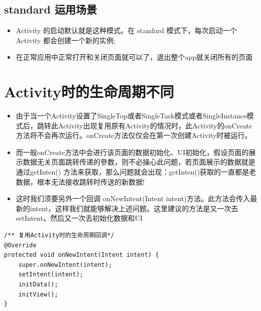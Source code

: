 \documentclass[9pt, b5paaper]{book}
\begin{document}
\subsection{standard 运用场景}
\label{sec-4-10-4}
\begin{itemize}
\item Activity 的启动默认就是这种模式。在 standard 模式下，每次启动一个 Activity 都会创建一个新的实例;
\item 在正常应用中正常打开和关闭页面就可以了，退出整个app就关闭所有的页面
\end{itemize}
\section{Activity时的生命周期不同}
\label{sec-4-11}
\begin{itemize}
\item 由于当一个Activity设置了SingleTop或者SingleTask模式或者SingleInstance模式后，跳转此Activity出现复用原有Activity的情况时，此Activity的onCreate方法将不会再次运行。onCreate方法仅仅会在第一次创建Activity时被运行。
\item 而一般onCreate方法中会进行该页面的数据初始化、UI初始化，假设页面的展示数据无关页面跳转传递的參数，则不必操心此问题，若页面展示的数据就是通过getInten() 方法来获取，那么问题就会出现：getInten()获取的一直都是老数据，根本无法接收跳转时传送的新数据!
\item 这时我们须要另外一个回调 onNewIntent(Intent intent)方法。此方法会传入最新的intent，这样我们就能够解决上述问题。这里建议的方法是又一次去setIntent。然后又一次去初始化数据和UI
\end{itemize}
\begin{verbatim}
/** 复用Activity时的生命周期回调*/
@Override     
protected void onNewIntent(Intent intent) {         
    super.onNewIntent(intent);         
    setIntent(intent);         
    initData();         
    initView();     
}
\end{verbatim}
\end{document}
